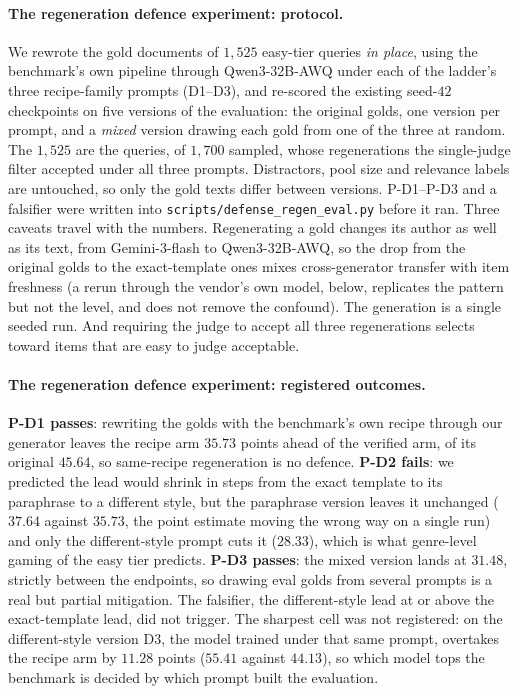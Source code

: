 \paragraph{The regeneration defence experiment: protocol.}
We rewrote the gold documents of $1{,}525$ easy-tier queries \emph{in place}, using the benchmark's own pipeline through Qwen3-32B-AWQ under each of the ladder's three recipe-family prompts (D1--D3), and re-scored the existing seed-$42$ checkpoints on five versions of the evaluation: the original golds, one version per prompt, and a \emph{mixed} version drawing each gold from one of the three at random. The $1{,}525$ are the queries, of $1{,}700$ sampled, whose regenerations the single-judge filter accepted under all three prompts. Distractors, pool size and relevance labels are untouched, so only the gold texts differ between versions. P-D1--P-D3 and a falsifier were written into \texttt{scripts/defense\_regen\_eval.py} before it ran. Three caveats travel with the numbers. Regenerating a gold changes its author as well as its text, from Gemini-3-flash to Qwen3-32B-AWQ, so the drop from the original golds to the exact-template ones mixes cross-generator transfer with item freshness (a rerun through the vendor's own model, below, replicates the pattern but not the level, and does not remove the confound). The generation is a single seeded run. And requiring the judge to accept all three regenerations selects toward items that are easy to judge acceptable.

\paragraph{The regeneration defence experiment: registered outcomes.}
\textbf{P-D1 passes}: rewriting the golds with the benchmark's own recipe through our generator leaves the recipe arm $35.73$ points ahead of the verified arm, of its original $45.64$, so same-recipe regeneration is no defence. \textbf{P-D2 fails}: we predicted the lead would shrink in steps from the exact template to its paraphrase to a different style, but the paraphrase version leaves it unchanged ($37.64$ against $35.73$, the point estimate moving the wrong way on a single run) and only the different-style prompt cuts it ($28.33$), which is what genre-level gaming of the easy tier predicts. \textbf{P-D3 passes}: the mixed version lands at $31.48$, strictly between the endpoints, so drawing eval golds from several prompts is a real but partial mitigation. The falsifier, the different-style lead at or above the exact-template lead, did not trigger. The sharpest cell was not registered: on the different-style version D3, the model trained under that same prompt, overtakes the recipe arm by $11.28$ points ($55.41$ against $44.13$), so which model tops the benchmark is decided by which prompt built the evaluation.

